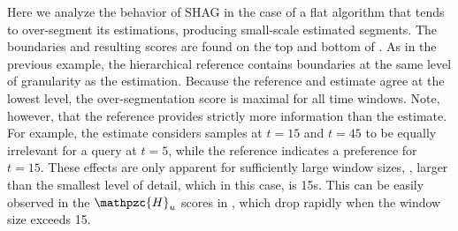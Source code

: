 \documentclass{article}
\def\shag{\ensuremath{\mathpzc{H}}}
\begin{document}
Here we analyze the behavior of SHAG in the case of a flat algorithm that tends to over-segment its estimations, producing small-scale estimated segments.
The boundaries and resulting scores are found on the top and bottom of .
As in the previous example, the hierarchical reference contains boundaries at the same level of granularity as the estimation. 
Because the reference and estimate agree at the lowest level, the over-segmentation score is maximal for all time windows.
Note, however, that the reference provides strictly more information than the estimate.  For example, the estimate considers samples at $t=15$ and $t=45$ to be equally irrelevant for a 
query at $t=5$, while the reference indicates a preference for $t=15$.  These effects are only apparent for sufficiently large window sizes, \eg, larger than the smallest level of
detail, which in this case, is 15s.  This can be easily observed in the $\shag_u$ scores in , which drop rapidly when the window size exceeds 15.
\end{document}
